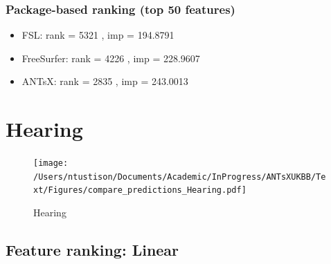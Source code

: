 \documentclass[
  10pt,
]{article}
\begin{document}
\hypertarget{package-based-ranking-top-50-features-6}{%
\subsubsection{Package-based ranking (top 50
features)}\label{package-based-ranking-top-50-features-6}}

\begin{itemize}
\item
  FSL: rank = 5321 , imp = 194.8791
\item
  FreeSurfer: rank = 4226 , imp = 228.9607
\item
  ANTsX: rank = 2835 , imp = 243.0013
\end{itemize}

\clearpage

\hypertarget{hearing}{%
\section{Hearing}\label{hearing}}

\begin{figure}
\centering
\texttt{[image: /Users/ntustison/Documents/Academic/InProgress/ANTsXUKBB/Text/Figures/compare\_predictions\_Hearing.pdf]}
\caption{Hearing}
\end{figure}

\hypertarget{feature-ranking-linear-5}{%
\subsection{Feature ranking: Linear}\label{feature-ranking-linear-5}}
\end{document}
